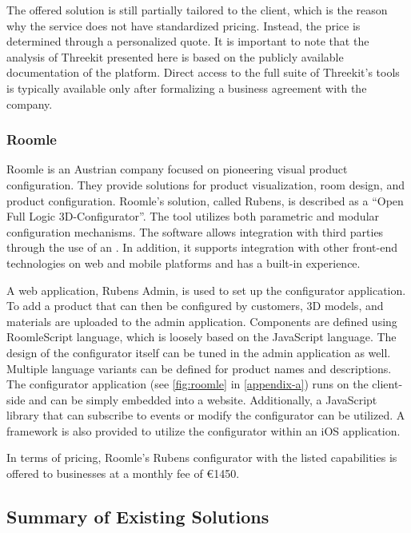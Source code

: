 The offered solution is still partially tailored to the client, which is the reason why the service does not have standardized pricing. Instead, the price is determined through a personalized quote. It is important to note that the analysis of Threekit presented here is based on the publicly available documentation of the platform. Direct access to the full suite of Threekit's tools is typically available only after formalizing a business agreement with the company.


\subsubsection{Roomle}

Roomle is an Austrian company focused on pioneering visual product configuration. They provide solutions for product visualization, room design, and product configuration. Roomle's solution, called Rubens, is described as a \enquote{Open Full Logic 3D-Configurator}. The tool utilizes both parametric and modular configuration mechanisms. The software allows integration with third parties through the use of an . In addition, it supports integration with other front-end technologies on web and mobile platforms and has a built-in  experience.~\cite{RoomleAbout}

A web application, Rubens Admin, is used to set up the configurator application. To add a product that can then be configured by customers, 3D models, and materials are uploaded to the admin application. Components are defined using RoomleScript language, which is loosely based on the JavaScript language. The design of the configurator itself can be tuned in the admin application as well. Multiple language variants can be defined for product names and descriptions. The configurator application (see \autoref{fig:roomle} in \autoref{appendix-a}) runs on the client-side and can be simply embedded into a website. Additionally, a JavaScript library that can subscribe to events or modify the configurator can be utilized. A framework is also provided to utilize the configurator within an iOS application.~\cite{RoomleDocumentation}

In terms of pricing, Roomle's Rubens configurator with the listed capabilities is offered to businesses at a monthly fee of €1450.~\cite{RoomleFullLogic}

\subsection{Summary of Existing Solutions}

